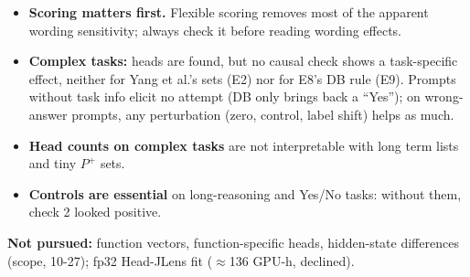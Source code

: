 \documentclass[10pt,a4paper]{article}
\newcommand{\yes}{\textcolor{green!45!black}{\ding{51}}}
\newcommand{\no}{\textcolor{red!70!black}{\ding{55}}}
\begin{document}
\begin{itemize}
\item \yes{} \textbf{Scoring matters first.} Flexible scoring removes most of the apparent wording sensitivity; always check it before reading wording effects.
\item \no{} \textbf{Complex tasks:} heads are found, but no causal check shows a task-specific effect, neither for Yang et al.'s sets (E2) nor for E8's DB rule (E9). Prompts without task info elicit no attempt (DB only brings back a ``Yes''); on wrong-answer prompts, any perturbation (zero, control, label shift) helps as much.
\item \no{} \textbf{Head counts on complex tasks} are not interpretable with long term lists and tiny $P^+$ sets.
\item \textbf{Controls are essential} on long-reasoning and Yes/No tasks: without them, check 2 looked positive.
\end{itemize}

\textbf{Not pursued:} function vectors, function-specific heads, hidden-state differences (scope, 10-27); fp32 Head-JLens fit ($\approx$136 GPU-h, declined).
\end{document}
